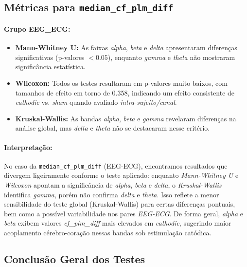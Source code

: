 \subsection{\texorpdfstring{Métricas para \texttt{median\_cf\_plm\_diff}}{Métricas para median\_cf\_plm\_diff}}

\paragraph{Grupo EEG\_ECG:}
\begin{itemize}
    \item \textbf{Mann-Whitney U:} As faixas \emph{alpha}, \emph{beta} e \emph{delta} apresentaram diferenças significativas (p-valores $< 0.05$), enquanto \emph{gamma} e \emph{theta} não mostraram significância estatística.
    \item \textbf{Wilcoxon:} Todos os testes resultaram em p-valores muito baixos, com tamanhos de efeito em torno de 0.358, indicando um efeito consistente de \emph{cathodic} vs. \emph{sham} quando avaliado \emph{intra-sujeito/canal}.
    \item \textbf{Kruskal-Wallis:} As bandas \emph{alpha}, \emph{beta} e \emph{gamma} revelaram diferenças na análise global, mas \emph{delta} e \emph{theta} não se destacaram nesse critério.
\end{itemize}

\paragraph{Interpretação:}

No caso da \texttt{median\_cf\_plm\_diff} (EEG-ECG), encontramos resultados que divergem ligeiramente conforme o teste aplicado: enquanto \emph{Mann-Whitney U} e \emph{Wilcoxon} apontam a significância de \emph{alpha}, \emph{beta} e \emph{delta}, o \emph{Kruskal-Wallis} identifica \emph{gamma}, porém não confirma \emph{delta} e \emph{theta}. Isso reflete a menor sensibilidade do teste global (Kruskal-Wallis) para certas diferenças pontuais, bem como a possível variabilidade nos pares \emph{EEG-ECG}. De forma geral, \emph{alpha} e \emph{beta} exibem valores \emph{cf\_plm\_diff} mais elevados em \emph{cathodic}, sugerindo maior acoplamento cérebro-coração nessas bandas sob estimulação catódica.

\subsection{Conclusão Geral dos Testes}

